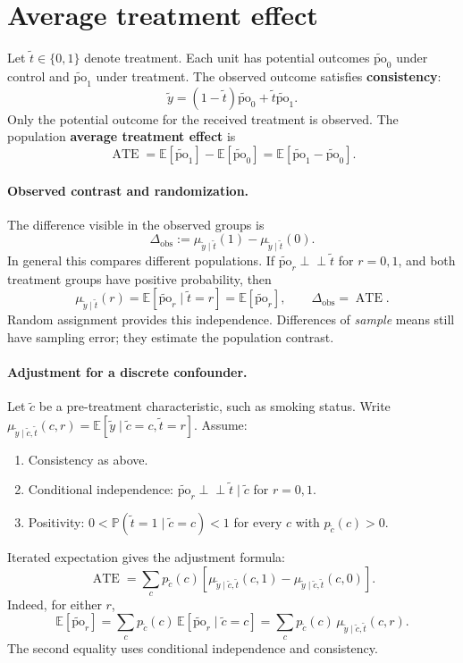 \documentclass[11pt]{article}
\newcommand{\Pbb}{\mathbb{P}}
\newcommand{\E}{\mathbb{E}}
\newcommand{\rv}[1]{\widetilde{#1}}
\newcommand{\po}[1]{\widetilde{\mathrm{po}}_{#1}}
\newcommand{\indep}{\mathrel{\perp\!\!\!\perp}}
\newcommand{\ATE}{\operatorname{ATE}}
\begin{document}
\newpage
\section{Average treatment effect}
Let $\rv{t}\in\{0,1\}$ denote treatment. Each unit has potential outcomes
$\po{0}$ under control and $\po{1}$ under treatment. The observed outcome
satisfies \textbf{consistency}:
\[
  \rv{y}=(1-\rv{t})\po{0}+\rv{t}\po{1}.
\]
Only the potential outcome for the received treatment is observed. The
population \textbf{average treatment effect} is
\[
  \boxed{\ATE=\E[\po{1}]-\E[\po{0}]
       =\E[\po{1}-\po{0}].}
\]

\paragraph{Observed contrast and randomization.}
The difference visible in the observed groups is
\[
  \Delta_{\mathrm{obs}}
  :=\mu_{\rv{y}\mid\rv{t}}(1)-\mu_{\rv{y}\mid\rv{t}}(0).
\]
In general this compares different populations. If
$\po{r}\indep\rv{t}$ for $r=0,1$, and both treatment groups have positive
probability, then
\[
  \mu_{\rv{y}\mid\rv{t}}(r)
  =\E[\po{r}\mid\rv{t}=r]
  =\E[\po{r}],
  \qquad \Delta_{\mathrm{obs}}=\ATE.
\]
Random assignment provides this independence. Differences of \emph{sample}
means still have sampling error; they estimate the population contrast.

\paragraph{Adjustment for a discrete confounder.}
Let $\rv{c}$ be a pre-treatment characteristic, such as smoking status.
Write $\mu_{\rv{y}\mid\rv{c},\rv{t}}(c,r)
=\E[\rv{y}\mid\rv{c}=c,\rv{t}=r]$. Assume:
\begin{enumerate}[label=\arabic*.,itemsep=0.2em]
  \item Consistency as above.
  \item Conditional independence:
    $\po{r}\indep\rv{t}\mid\rv{c}$ for $r=0,1$.
  \item Positivity: $0<\Pbb(\rv{t}=1\mid\rv{c}=c)<1$
    for every $c$ with $p_{\rv{c}}(c)>0$.
\end{enumerate}
Iterated expectation gives the adjustment formula:
\[
  \boxed{\ATE=\sum_c p_{\rv{c}}(c)
    \left[\mu_{\rv{y}\mid\rv{c},\rv{t}}(c,1)
          -\mu_{\rv{y}\mid\rv{c},\rv{t}}(c,0)\right].}
\]
Indeed, for either $r$,
\[
  \E[\po{r}]
  =\sum_c p_{\rv{c}}(c)\,\E[\po{r}\mid\rv{c}=c]
  =\sum_c p_{\rv{c}}(c)\,\mu_{\rv{y}\mid\rv{c},\rv{t}}(c,r).
\]
The second equality uses conditional independence and consistency.
\end{document}
